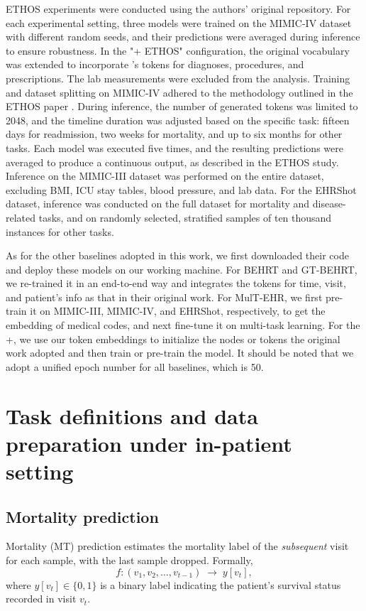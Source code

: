 ETHOS experiments were conducted using the authors’ original repository. For each experimental setting, three models were trained on the MIMIC-IV dataset with different random seeds, and their predictions were averaged during inference to ensure robustness. In the "\model + ETHOS" configuration, the original vocabulary was extended to incorporate \model's tokens for diagnoses, procedures, and prescriptions. The lab measurements were excluded from the analysis.
Training and dataset splitting on MIMIC-IV adhered to the methodology outlined in the ETHOS paper \cite{ethos}. During inference, the number of generated tokens was limited to 2048, and the timeline duration was adjusted based on the specific task: fifteen days for readmission, two weeks for mortality, and up to six months for other tasks. Each model was executed five times, and the resulting predictions were averaged to produce a continuous output, as described in the ETHOS study.
Inference on the MIMIC-III dataset was performed on the entire dataset, excluding BMI, ICU stay tables, blood pressure, and lab data. For the EHRShot dataset, inference was conducted on the full dataset for mortality and disease-related tasks, and on randomly selected, stratified samples of ten thousand instances for other tasks.

As for the other baselines adopted in this work, we first downloaded their code and deploy these models on our working machine. For BEHRT and GT-BEHRT, we re-trained it in an end-to-end way and integrates the tokens for time, visit, and patient's info as that in their original work. For MulT-EHR, we first pre-train it on MIMIC-III, MIMIC-IV, and EHRShot, respectively, to get the embedding of medical codes, and next fine-tune it on multi-task learning. For the \model+, we use our token embeddings to initialize the nodes or tokens the original work adopted and then train or pre-train the model. It should be noted that we adopt a unified epoch number for all baselines, which is 50.

\section{Task definitions and data preparation under in-patient setting}\label{appendix_task_definitions}

\subsection{Mortality prediction}
Mortality (MT) prediction estimates the mortality label of the 
\emph{subsequent} visit for each sample, with the last sample dropped.
Formally,
\[
    f : (v_1, v_2, \ldots, v_{t-1}) \;\to\; y[v_t],
\]
where \(y[v_t] \in \{0, 1\}\) is a binary label indicating the patient’s 
survival status recorded in visit \(v_t\).


